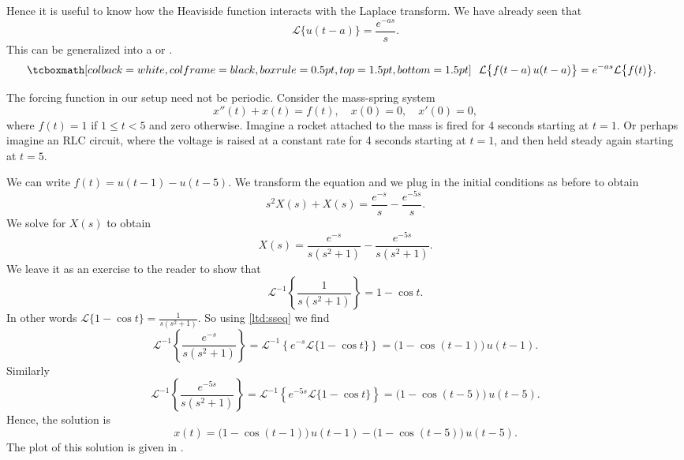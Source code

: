 Hence it is 
useful to know how the Heaviside function interacts with the Laplace
transform.  We have already seen that
\begin{equation*}
\mathcal{L} \bigl\{ u(t-a) \bigr\} = \frac{e^{-as}}{s} .
\end{equation*}
This can be generalized into a \emph{}
or \emph{}.
\begin{equation} \label{ltd:sseq}
\mybxbg{~~
\mathcal{L} \bigl\{ f(t-a) \, u(t-a) \bigr\}
= e^{-as} \mathcal{L} \bigl\{ f(t) \bigr\} .
~~}
\end{equation}

\begin{example} \label{lt:rocketex}
The forcing function in our setup need not be periodic.
Consider
the mass-spring system
\begin{equation*}
x''(t) + x(t) = f(t) , \quad x(0) = 0, \quad x'(0) = 0,
\end{equation*}
where $f(t) = 1$ if $1 \leq t < 5$ and zero otherwise.  Imagine a
rocket attached to the mass is fired for 4 seconds starting at
$t=1$.  Or perhaps imagine an RLC circuit, where the voltage is raised
at a constant rate for 4 seconds starting at $t=1$, and then held steady 
again
starting at $t=5$.

We can
write $f(t) = u(t-1) - u(t-5)$.  We transform the equation and we plug in
the initial conditions as before to obtain
\begin{equation*}
s^2 X(s) + X(s) = \frac{e^{-s}}{s} - \frac{e^{-5s}}{s} .
\end{equation*}
We solve for $X(s)$ to obtain
\begin{equation*}
X(s) = \frac{e^{-s}}{s(s^2+1)} - \frac{e^{-5s}}{s(s^2+1)} .
\end{equation*}
We leave it as an exercise to the reader to show that
\begin{equation*}
{\mathcal{L}}^{-1} \left\{ \frac{1}{s(s^2+1)} \right\}
= 1 - \cos t .
\end{equation*}
In other words 
$\mathcal{L} \{ 1 - \cos t  \} = 
\frac{1}{s(s^2+1)}$.  So using \eqref{ltd:sseq} we find
\begin{equation*}
{\mathcal{L}}^{-1} \left\{ \frac{e^{-s}}{s(s^2+1)} \right\}
=
{\mathcal{L}}^{-1} \left\{
e^{-s}
\mathcal{L} \{ 1 - \cos t \}
\right\}
=
\bigl( 1 - \cos (t-1) \bigr) \, u(t-1) .
\end{equation*}
Similarly
\begin{equation*}
{\mathcal{L}}^{-1} \left\{ \frac{e^{-5s}}{s(s^2+1)} \right\}
=
{\mathcal{L}}^{-1} \left\{
e^{-5s}
\mathcal{L} \{ 1 - \cos t \}
\right\}
=
\bigl( 1 - \cos (t-5) \bigr) \, u(t-5) .
\end{equation*}
Hence, the solution is
\begin{equation*}
x(t) = 
\bigl( 1 - \cos (t-1) \bigr) \, u(t-1) -
\bigl( 1 - \cos (t-5) \bigr) \, u(t-5) .
\end{equation*}
The plot of this solution is given in .


\end{example}
